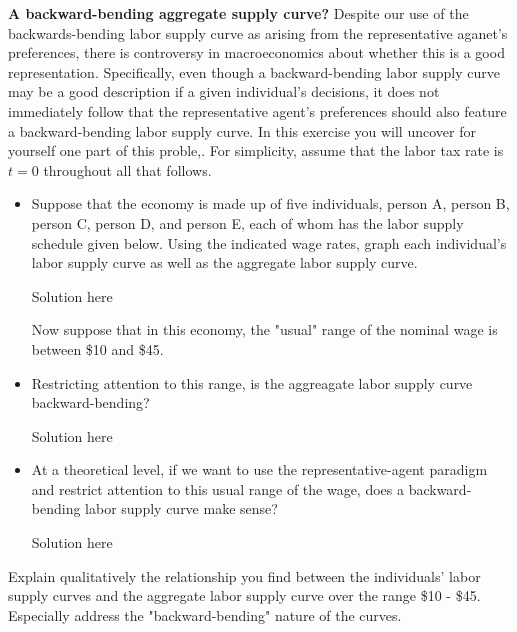 \documentclass[11pt]{SelfArxOneColBMN}
\begin{document}
\begin{exercise}
	\textbf{A backward-bending aggregate supply curve?} Despite our use of the backwards-bending labor supply curve as arising from the representative aganet's preferences, there is controversy in macroeconomics about whether this is a good representation. Specifically, even though a backward-bending labor supply curve may be a good description if a given individual's decisions, it does not immediately follow that the representative agent's preferences should also feature a backward-bending labor supply curve. In this exercise you will uncover for yourself one part of this proble,. For simplicity, assume that the labor tax rate is $t = 0$ throughout all that follows.
	\begin{itemize}
		\item Suppose that the economy is made up of five individuals, person A, person B, person C, person D, and person E, each of whom has the labor supply schedule given below. Using the indicated wage rates, graph each individual's labor supply curve as well as the aggregate labor supply curve.
		\begin{solution}
			Solution here
		\end{solution}
\noindent Now suppose that in this economy, the "usual" range of the nominal wage is between \$10 and \$45.
		\item Restricting attention to this range, is the aggreagate labor supply curve backward-bending?
		\begin{solution}
			Solution here
		\end{solution}
		\item At a theoretical level, if we want to use the representative-agent paradigm and restrict attention to this usual range of the wage, does a backward-bending labor supply curve make sense?
		\begin{solution}
			Solution here
		\end{solution}
	\end{itemize}
	Explain qualitatively the relationship you find between the individuals' labor supply curves and the aggregate labor supply curve over the range \$10 - \$45. Especially address the "backward-bending" nature of the curves.
\end{exercise}
\end{document}
